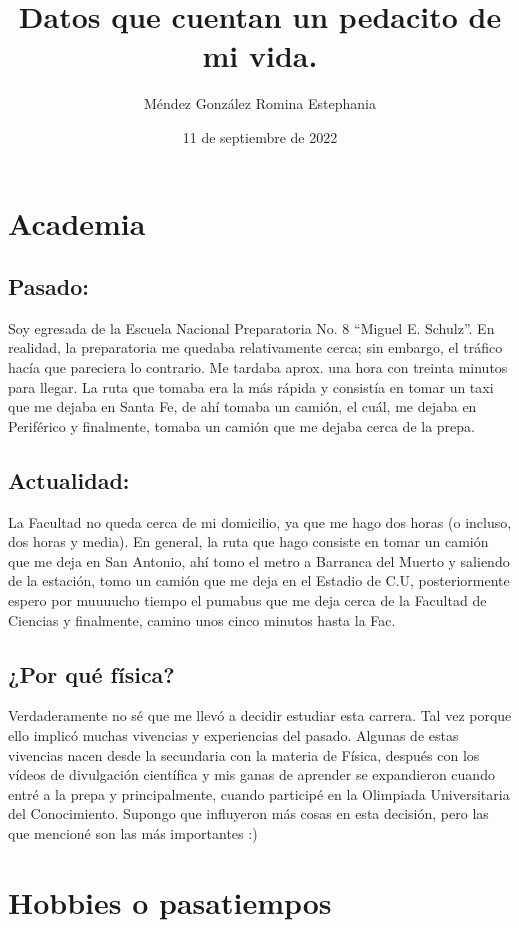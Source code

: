 \documentclass[letterpaper, 12pt]{article}
\title{Datos que cuentan un pedacito de mi vida. }
\author{Méndez González Romina Estephania}
\date{11 de septiembre de 2022}
\begin{document}
\maketitle

\section{\Large{Academia}}
    \subsection{\large{Pasado:}}
        \normalsize{Soy egresada de la Escuela Nacional Preparatoria No. 8 ``Miguel E. Schulz''. En realidad, la preparatoria me quedaba relativamente cerca; sin embargo, el tráfico hacía que pareciera lo contrario. Me tardaba aprox. una hora con treinta minutos para llegar. La ruta que tomaba era la más rápida y consistía en tomar un taxi que me dejaba en Santa Fe, de ahí tomaba un camión, el cuál, me dejaba en Periférico y finalmente, tomaba un camión que me dejaba cerca de la prepa.}  
    \subsection{\large{Actualidad:}}
        \normalsize{La Facultad no queda cerca de mi domicilio, ya que me hago dos horas (o incluso, dos horas y media). En general, la ruta que hago consiste en tomar un camión que me deja en San Antonio, ahí tomo el metro a Barranca del Muerto y saliendo de la estación, tomo un camión que me deja en el Estadio de C.U, posteriormente espero por muuuucho tiempo el pumabus que me deja cerca de la Facultad de Ciencias y finalmente, camino unos cinco minutos hasta la Fac.}
    \subsection{\large{¿Por qué física?}}
        \normalsize{Verdaderamente no sé que me llevó a decidir estudiar esta carrera. Tal vez porque ello implicó muchas vivencias y experiencias del pasado. Algunas de estas vivencias nacen desde la secundaria con la materia de Física, después con los vídeos de divulgación científica y mis ganas de aprender se expandieron cuando entré a la prepa y principalmente, cuando participé en la Olimpiada Universitaria del Conocimiento. Supongo que influyeron más cosas en esta decisión, pero las que mencioné son las más importantes :)}
    

\section{\Large{Hobbies o pasatiempos}}
\end{document}
